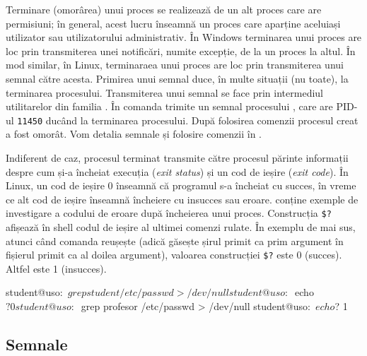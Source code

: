Terminare (omorârea) unui proces se realizează de un alt proces care are permisiuni; în
general, acest lucru înseamnă un proces care aparține aceluiași utilizator sau
utilizatorului administrativ. În Windows terminarea unui proces are loc prin
transmiterea unei notificări, numite excepție, de la un proces la altul. În mod
similar, în Linux, terminaraea unui proces are loc prin transmiterea unui semnal
către acesta. Primirea unui semnal duce, în multe situații (nu toate), la
terminarea procesului. Transmiterea unui semnal se face prin intermediul
utilitarelor din familia .
În  comanda  trimite un semnal procesului , care are PID-ul \texttt{11450} ducând la terminarea procesului.
După folosirea comenzii  procesul creat a fost omorât. Vom detalia semnale
și folosire comenzii  în
.


Indiferent de caz, procesul terminat transmite către procesul părinte informații
despre cum și-a încheiat execuția (\textit{exit status}) și un cod de ieșire
(\textit{exit code}). În Linux, un cod de ieșire 0 înseamnă că programul s-a
încheiat cu succes, în vreme ce alt cod de ieșire înseamnă încheiere cu insucces
sau eroare.  conține exemple de investigare a codului de eroare după
încheierea unui proces.
Construcția \texttt{\$?} afișează în shell codul de ieșire al ultimei comenzi rulate. În exemplu de mai sus, atunci când comanda  reușește (adică găsește șirul primit ca prim argument în fișierul primit ca al doilea argument), valoarea construcției \texttt{\$?} este 0 (succes). Altfel este 1 (insucces).

\begin{screen}[caption={Investigarea codului de ieșire al unui process},label={lst:process:exit-code}]
student@uso:~$ grep student /etc/passwd > /dev/null
student@uso:~$ echo $?
0
student@uso:~$ grep profesor /etc/passwd > /dev/null
student@uso:~$ echo $?
1
\end{screen}

\subsection{Semnale}
\label{sec:process:signal}

